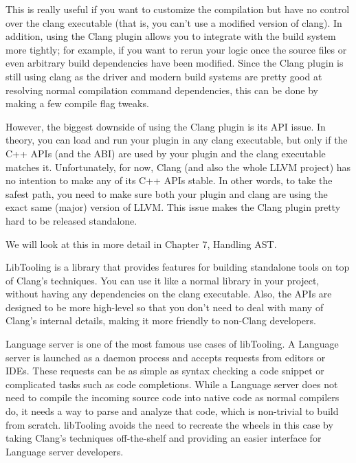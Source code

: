
This is really useful if you want to customize the compilation but have no control over the clang executable (that is, you can't use a modified version of clang). In addition, using the Clang plugin allows you to integrate with the build system more tightly; for example, if you want to rerun your logic once the source files or even arbitrary build dependencies have been modified. Since the Clang plugin is still using clang as the driver and modern build systems are pretty good at resolving normal compilation command dependencies, this can be done by making a few compile flag tweaks.

However, the biggest downside of using the Clang plugin is its API issue. In theory, you can load and run your plugin in any clang executable, but only if the C++ APIs (and the ABI) are used by your plugin and the clang executable matches it. Unfortunately, for now, Clang (and also the whole LLVM project) has no intention to make any of its C++ APIs stable. In other words, to take the safest path, you need to make sure both your plugin and clang are using the exact same (major) version of LLVM. This issue makes the Clang plugin pretty hard to be released standalone.

We will look at this in more detail in Chapter 7, Handling AST.


LibTooling is a library that provides features for building standalone tools on top of Clang's techniques. You can use it like a normal library in your project, without having any dependencies on the clang executable. Also, the APIs are designed to be more high-level so that you don't need to deal with many of Clang's internal details, making it more friendly to non-Clang developers.

Language server is one of the most famous use cases of libTooling. A Language server is launched as a daemon process and accepts requests from editors or IDEs. These requests can be as simple as syntax checking a code snippet or complicated tasks such as code completions. While a Language server does not need to compile the incoming source code into native code as normal compilers do, it needs a way to parse and analyze that code, which is non-trivial to build from scratch. libTooling avoids the need to recreate the wheels in this case by taking Clang's techniques off-the-shelf and providing an easier interface for Language server developers.

